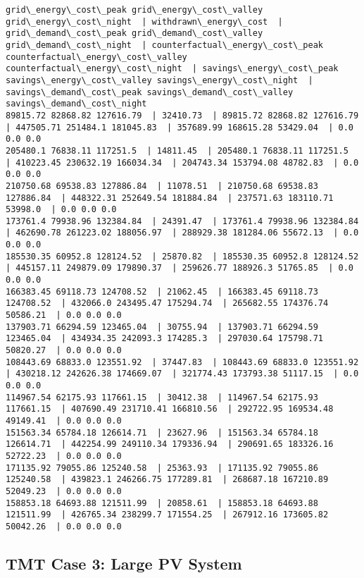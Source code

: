 \documentclass[11pt]{article}
\begin{document}
    \begin{Verbatim}[commandchars=\\\{\}]
grid\_energy\_cost\_peak grid\_energy\_cost\_valley grid\_energy\_cost\_night  | withdrawn\_energy\_cost  | grid\_demand\_cost\_peak grid\_demand\_cost\_valley grid\_demand\_cost\_night  | counterfactual\_energy\_cost\_peak counterfactual\_energy\_cost\_valley counterfactual\_energy\_cost\_night  | savings\_energy\_cost\_peak savings\_energy\_cost\_valley savings\_energy\_cost\_night  | savings\_demand\_cost\_peak savings\_demand\_cost\_valley savings\_demand\_cost\_night 
89815.72 82868.82 127616.79  | 32410.73  | 89815.72 82868.82 127616.79  | 447505.71 251484.1 181045.83  | 357689.99 168615.28 53429.04  | 0.0 0.0 0.0 
205480.1 76838.11 117251.5  | 14811.45  | 205480.1 76838.11 117251.5  | 410223.45 230632.19 166034.34  | 204743.34 153794.08 48782.83  | 0.0 0.0 0.0 
210750.68 69538.83 127886.84  | 11078.51  | 210750.68 69538.83 127886.84  | 448322.31 252649.54 181884.84  | 237571.63 183110.71 53998.0  | 0.0 0.0 0.0 
173761.4 79938.96 132384.84  | 24391.47  | 173761.4 79938.96 132384.84  | 462690.78 261223.02 188056.97  | 288929.38 181284.06 55672.13  | 0.0 0.0 0.0 
185530.35 60952.8 128124.52  | 25870.82  | 185530.35 60952.8 128124.52  | 445157.11 249879.09 179890.37  | 259626.77 188926.3 51765.85  | 0.0 0.0 0.0 
166383.45 69118.73 124708.52  | 21062.45  | 166383.45 69118.73 124708.52  | 432066.0 243495.47 175294.74  | 265682.55 174376.74 50586.21  | 0.0 0.0 0.0 
137903.71 66294.59 123465.04  | 30755.94  | 137903.71 66294.59 123465.04  | 434934.35 242093.3 174285.3  | 297030.64 175798.71 50820.27  | 0.0 0.0 0.0 
108443.69 68833.0 123551.92  | 37447.83  | 108443.69 68833.0 123551.92  | 430218.12 242626.38 174669.07  | 321774.43 173793.38 51117.15  | 0.0 0.0 0.0 
114967.54 62175.93 117661.15  | 30412.38  | 114967.54 62175.93 117661.15  | 407690.49 231710.41 166810.56  | 292722.95 169534.48 49149.41  | 0.0 0.0 0.0 
151563.34 65784.18 126614.71  | 23627.96  | 151563.34 65784.18 126614.71  | 442254.99 249110.34 179336.94  | 290691.65 183326.16 52722.23  | 0.0 0.0 0.0 
171135.92 79055.86 125240.58  | 25363.93  | 171135.92 79055.86 125240.58  | 439823.1 246266.75 177289.81  | 268687.18 167210.89 52049.23  | 0.0 0.0 0.0 
158853.18 64693.88 121511.99  | 20858.61  | 158853.18 64693.88 121511.99  | 426765.34 238299.7 171554.25  | 267912.16 173605.82 50042.26  | 0.0 0.0 0.0 

    \end{Verbatim}

    \hypertarget{tmt-case-3-large-pv-system}{%
\subsection{TMT Case 3: Large PV
System}\label{tmt-case-3-large-pv-system}}
\end{document}
